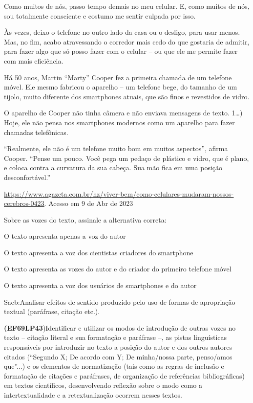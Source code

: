 {Como muitos de nós, passo tempo demais no meu celular. E, como muitos de
nós, sou totalmente consciente e costumo me sentir culpada por isso.

Às vezes, deixo o telefone no outro lado da casa ou o desligo, para usar
menos. Mas, no fim, acabo atravessando o corredor mais cedo do que
gostaria de admitir, para fazer algo que só posso fazer com o celular --
ou que ele me permite fazer com mais eficiência.

Há 50 anos, Martin ``Marty'' Cooper fez a primeira chamada de um
telefone móvel. Ele mesmo fabricou o aparelho -- um telefone bege, do
tamanho de um tijolo, muito diferente dos smartphones atuais, que são
finos e revestidos de vidro.

O aparelho de Cooper não tinha câmera e não enviava mensagens de texto.
1\ldots) Hoje, ele não pensa nos smartphones modernos como um aparelho
para fazer chamadas telefônicas.

``Realmente, ele não é um telefone muito bom em muitos aspectos'',
afirma Cooper. ``Pense um pouco. Você pega um pedaço de plástico e
vidro, que é plano, e coloca contra a curvatura da sua cabeça. Sua mão
fica em uma posição desconfortável.''

\href{https://www.agazeta.com.br/hz/viver-bem/como-celulares-mudaram-nossos-cerebros-0423}{\uline{https://www.agazeta.com.br/hz/viver-bem/como-celulares-mudaram-nossos-cerebros-0423}}.
Acesso em 9 de Abr de 2023

Sobre as vozes do texto, assinale a alternativa correta:

\begin{escolha}

\item
  O texto apresenta apenas a voz do autor
\item
  O texto apresenta a voz dos cientistas criadores do smartphone
\item
  O texto apresenta as vozes do autor e do criador do primeiro telefone
  móvel
\item
  O texto apresenta a voz dos usuários de smartphones e do autor
\end{escolha}

Saeb:Analisar efeitos de sentido produzido pelo uso de formas de
apropriação textual (paráfrase, citação etc.).

\textbf{(EF69LP43})Identificar e utilizar os modos de introdução de
outras vozes no texto -- citação literal e sua formatação e paráfrase
--, as pistas linguísticas responsáveis por introduzir no texto a
posição do autor e dos outros autores citados (``Segundo X; De acordo
com Y; De minha/nossa parte, penso/amos que''...) e os elementos de
normatização (tais como as regras de inclusão e formatação de citações e
paráfrases, de organização de referências bibliográficas) em textos
científicos, desenvolvendo reflexão sobre o modo como a
intertextualidade e a retextualização ocorrem nesses textos.

}
